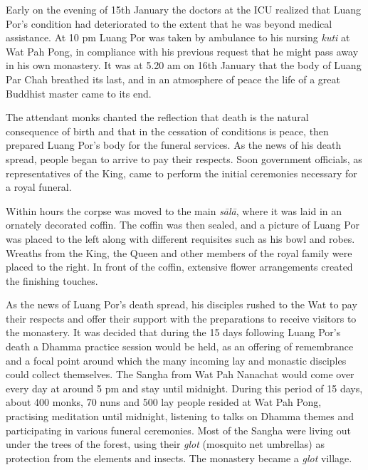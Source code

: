 Early on the evening of 15th January the doctors at the ICU realized
that Luang Por's condition had deteriorated to the extent that he was
beyond medical assistance. At 10 pm Luang Por was taken by ambulance to
his nursing \emph{kuti} at Wat Pah Pong, in compliance with his previous
request that he might pass away in his own monastery. It was at 5.20 am
on 16th January that the body of Luang Par Chah breathed its last, and
in an atmosphere of peace the life of a great Buddhist master came to
its end.

The attendant monks chanted the reflection that death is the natural
consequence of birth and that in the cessation of conditions is peace,
then prepared Luang Por's body for the funeral services. As the news of
his death spread, people began to arrive to pay their respects. Soon
government officials, as representatives of the King, came to perform
the initial ceremonies necessary for a royal funeral.

Within hours the corpse was moved to the main \emph{sālā}, where it was
laid in an ornately decorated coffin. The coffin was then sealed, and a
picture of Luang Por was placed to the left along with different
requisites such as his bowl and robes. Wreaths from the King, the Queen
and other members of the royal family were placed to the right. In front
of the coffin, extensive flower arrangements created the finishing
touches.

As the news of Luang Por's death spread, his disciples rushed to the Wat
to pay their respects and offer their support with the preparations to
receive visitors to the monastery. It was decided that during the 15
days following Luang Por's death a Dhamma practice session would be
held, as an offering of remembrance and a focal point around which the
many incoming lay and monastic disciples could collect themselves. The
Sangha from Wat Pah Nanachat would come over every day at around 5 pm
and stay until midnight. During this period of 15 days, about 400 monks,
70 nuns and 500 lay people resided at Wat Pah Pong, practising
meditation until midnight, listening to talks on Dhamma themes and
participating in various funeral ceremonies. Most of the Sangha were
living out under the trees of the forest, using their \emph{glot}
(mosquito net umbrellas) as protection from the elements and insects.
The monastery became a \emph{glot} village.

